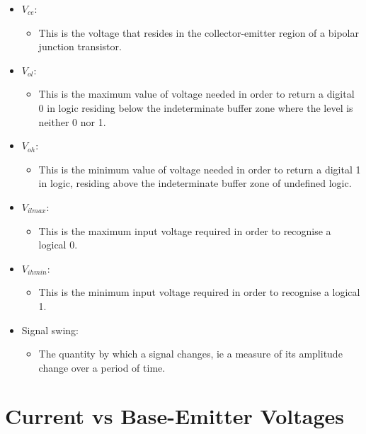 \documentclass[12pt]{article}
\begin{document}
\begin{itemize}
\begin{itemize}
\end{itemize}
\item $V_{ce}$:
\begin{itemize}
\item This is the voltage that resides in the collector-emitter region of a bipolar junction transistor.
\end{itemize}
\item $V_{ol}$:
\begin{itemize}
\item This is the maximum value of voltage needed in order to return a digital 0 in logic residing below the indeterminate buffer zone where the level is neither 0 nor 1.
\end{itemize}
\item $V_{oh}$:
\begin{itemize}
\item This is the minimum value of voltage needed in order to return a digital 1 in logic, residing above the indeterminate buffer zone of undefined logic.
\end{itemize}
\item $V_{il max}$:
\begin{itemize}
\item This is the maximum input voltage required in order to recognise a logical 0.
\end{itemize}
\item $V_{ih min}$:
\begin{itemize}
\item This is the minimum input voltage required in order to recognise a logical 1.
\end{itemize}
\item Signal swing:
\begin{itemize}
\item The quantity by which a signal changes, ie a measure of its amplitude change over a period of time.
\end{itemize}
\end{itemize}

\section{Current vs Base-Emitter Voltages}
\end{document}

